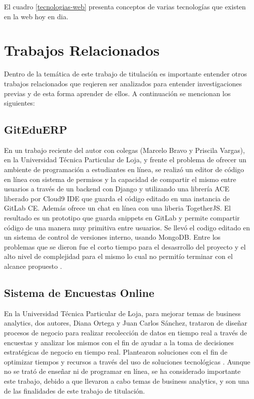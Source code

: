 El cuadro \ref{tecnologias-web} presenta conceptos de varias tecnologías que existen en la web hoy en dia.

\pagebreak

\section{Trabajos Relacionados}
Dentro de la temática de este trabajo de titulación es importante entender otros trabajos relacionados que reqieren ser analizados para entender investigaciones previas y de esta forma aprender de ellos. A continuación se mencionan los siguientes:

  
\subsection{GitEduERP}
En un trabajo reciente del autor con colegas (Marcelo Bravo y Priscila Vargas), en la Universidad Técnica Particular de Loja, y frente el problema de ofrecer un ambiente de programación a estudiantes en línea, se realizó un editor de código en línea con sistema de permisos y la capacidad de compartir el mismo entre usuarios a través de un backend con Django y utilizando una librería ACE liberado por Cloud9 IDE que guarda el código editado en una instancia de GitLab CE. Además ofrece un chat en línea con una liberia TogetherJS. El resultado es un prototipo que guarda snippets en GitLab y permite compartir código de una manera muy primitiva entre usuarios. Se llevó el codigo editado en un sistema de control de versiones interno, usando MongoDB. Entre los problemas que se dieron fue el corto tiempo para el desasrrollo del proyecto y el alto nivel de complejidad para el mismo lo cual no permitío terminar con el alcance propuesto \citep{UTPL-GitEduERP}.
  

 
\subsection{Sistema de Encuestas Online}
En la Universidad Técnica Particular de Loja, para mejorar temas de business analytics, dos autores, Diana Ortega y Juan Carlos Sánchez, trataron de diseñar procesos de negocio para realizar recolección de datos en tiempo real a través de encuestas y analizar los mismos con el fin de ayudar a la toma de decisiones estratégicas de negocio en tiempo real. Plantearon soluciones con el fin de optimizar tiempos y recursos a través del uso de soluciones tecnológicas \citep{UTPL-Thesis-Encuestas-Online}. Aunque no se trató de enseñar ni de programar en línea, se ha considerado importante este trabajo, debido a que llevaron a cabo temas de business analytics, y son una de las finalidades de este trabajo de titulación.
 

